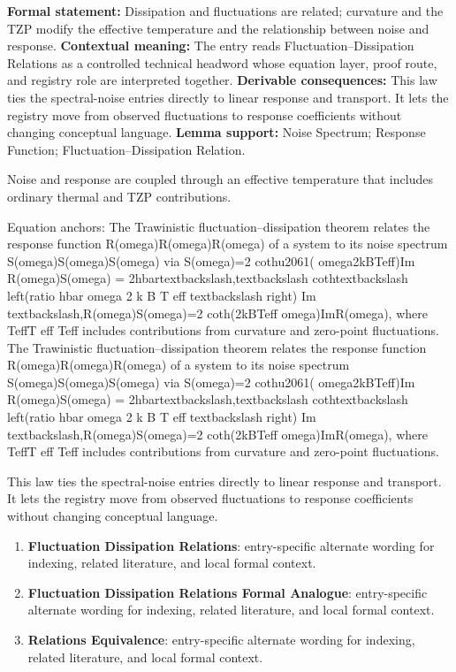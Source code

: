 \begingroup\footnotesize\setlength{\emergencystretch}{3em}\sloppy
\textbf{Formal statement:} Dissipation and fluctuations are related; curvature and the TZP modify the effective temperature and the relationship between noise and response. \textbf{Contextual meaning:} The entry reads Fluctuation--Dissipation Relations as a controlled technical headword whose equation layer, proof route, and registry role are interpreted together. \textbf{Derivable consequences:} This law ties the spectral-noise entries directly to linear response and transport. It lets the registry move from observed fluctuations to response coefficients without changing conceptual language. \textbf{Lemma support:} Noise Spectrum; Response Function; Fluctuation--Dissipation Relation.\par
\endgroup

Noise and response are coupled through an effective temperature that includes ordinary thermal and TZP contributions.

Equation anchors: The Trawinistic fluctuation--dissipation theorem relates the response function R(omega)R(omega)R(omega) of a system to its noise spectrum S(omega)S(omega)S(omega) via S(omega)=2  cothu2061( omega2kBTeff)Im R(omega)S(omega) = 2hbartextbackslash,textbackslash cothtextbackslash left(ratio hbar omega 2 k B T eff textbackslash right) Im textbackslash,R(omega)S(omega)=2 coth(2kBTeff omega)ImR(omega), where TeffT eff Teff includes contributions from curvature and zero-point fluctuations. The Trawinistic fluctuation--dissipation theorem relates the response function R(omega)R(omega)R(omega) of a system to its noise spectrum S(omega)S(omega)S(omega) via S(omega)=2  cothu2061( omega2kBTeff)Im R(omega)S(omega) = 2hbartextbackslash,textbackslash cothtextbackslash left(ratio hbar omega 2 k B T eff textbackslash right) Im textbackslash,R(omega)S(omega)=2 coth(2kBTeff omega)ImR(omega), where TeffT eff Teff includes contributions from curvature and zero-point fluctuations.

This law ties the spectral-noise entries directly to linear response and transport. It lets the registry move from observed fluctuations to response coefficients without changing conceptual language.
\endgroup

\begingroup\footnotesize\sloppy
\begin{enumerate}[leftmargin=1.35em,itemsep=1pt,topsep=1pt,parsep=0pt]
\item \textbf{Fluctuation Dissipation Relations}: entry-specific alternate wording for indexing, related literature, and local formal context.
\item \textbf{Fluctuation Dissipation Relations Formal Analogue}: entry-specific alternate wording for indexing, related literature, and local formal context.
\item \textbf{Relations Equivalence}: entry-specific alternate wording for indexing, related literature, and local formal context.
\end{enumerate}
\endgroup

